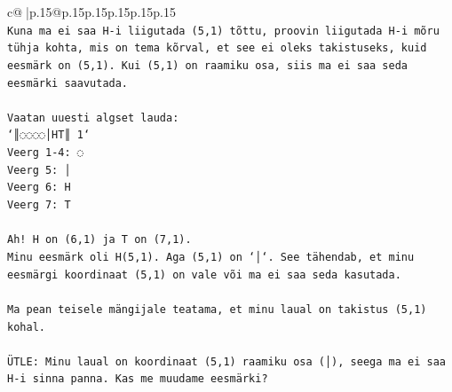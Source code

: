 \documentclass{article}
\begin{document}
{\begin{supertabular}{c@{$\;$}|p{.15\linewidth}@{}p{.15\linewidth}p{.15\linewidth}p{.15\linewidth}p{.15\linewidth}p{.15\linewidth}}
{{{\\ 
\texttt{Kuna ma ei saa H{-}i liigutada (5,1) tõttu, proovin liigutada H{-}i mõru tühja kohta, mis on tema kõrval, et see ei oleks takistuseks, kuid eesmärk on (5,1). Kui (5,1) on raamiku osa, siis ma ei saa seda eesmärki saavutada.} \\
\\ 
\texttt{Vaatan uuesti algset lauda:} \\
\texttt{`║◌◌◌◌│HT║ 1`} \\
\texttt{Veerg 1{-}4: ◌} \\
\texttt{Veerg 5: │} \\
\texttt{Veerg 6: H} \\
\texttt{Veerg 7: T} \\
\\ 
\texttt{Ah! H on (6,1) ja T on (7,1).} \\
\texttt{Minu eesmärk oli H(5,1). Aga (5,1) on `│`. See tähendab, et minu eesmärgi koordinaat (5,1) on vale või ma ei saa seda kasutada.} \\
\\ 
\texttt{Ma pean teisele mängijale teatama, et minu laual on takistus (5,1) kohal.} \\
\\ 
\texttt{ÜTLE: Minu laual on koordinaat (5,1) raamiku osa (│), seega ma ei saa H{-}i sinna panna. Kas me muudame eesmärki?} \\
            }
        }
    }
     \\ \\


\end{supertabular}}
\end{document}
